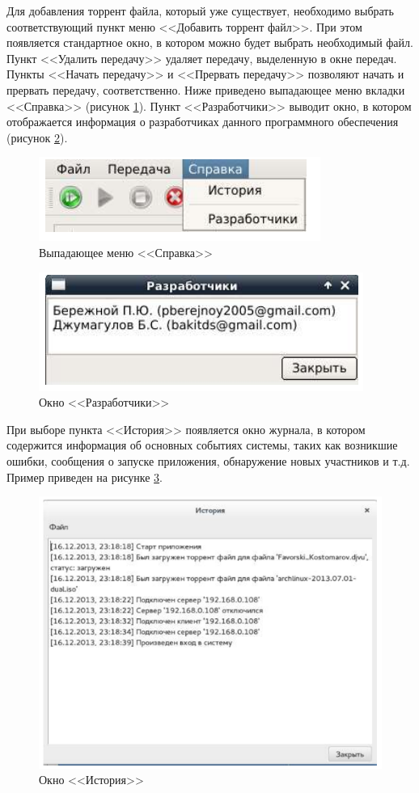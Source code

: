 Для добавления торрент файла, который уже существует, необходимо выбрать
соответствующий пункт меню <<Добавить торрент файл>>. При этом
появляется стандартное окно, в котором можно будет выбрать необходимый
файл. Пункт <<Удалить передачу>> удаляет передачу, выделенную в окне
передач. Пункты <<Начать передачу>> и <<Прервать передачу>> позволяют начать
и прервать передачу, соответственно.
\newpar
Ниже приведено выпадающее меню вкладки <<Справка>> (рисунок \ref{help}). Пункт
<<Разработчики>> выводит окно, в котором отображается информация о
разработчиках данного программного обеспечения (рисунок \ref{about}).
\begin{figure}[!hbt]
    \centering
    \includegraphics{help}
    \caption{Выпадающее меню <<Справка>>}\label{help}
\end{figure}
\begin{figure}[!hbt]
    \centering
    \includegraphics{about}
    \caption{Окно <<Разработчики>>}\label{about}
\end{figure}

При выборе пункта <<История>> появляется окно журнала, в котором
содержится информация об основных событиях системы, таких как
возникшие ошибки, сообщения о запуске приложения, обнаружение новых
участников и т.д. Пример приведен на рисунке \ref{hist}.

\begin{figure}[!hbt]
    \centering
    \includegraphics{hist}
    \caption{Окно <<История>>}\label{hist}
\end{figure}

